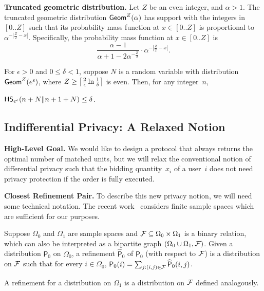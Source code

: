 


\noindent \textbf{Truncated geometric distribution.} Let $Z$ 
be an even integer,
and $\alpha > 1$. The truncated geometric distribution ${\sf Geom}^Z(\alpha)$ has support with the integers in $[0..Z]$ such that its probability mass function at $x \in [0..Z]$ is proportional to $\alpha^{-| \frac{Z}{2} - x |}$. Specifically, the probability mass function at $x \in [0..Z]$ is 
\[
\frac{\alpha - 1}{\alpha + 1 - 2 \alpha^{-\frac{Z}{2}}} \cdot \alpha^{-\left|\frac{Z}{2} - x \right|}.
\]

\begin{fact}
\label{fact:geom_dp}
For $\epsilon > 0$ and $0 \leq \delta < 1$, 
suppose $N$ is a random variable with distribution ${\sf Geom}^Z(e^\epsilon)$,
where $Z \geq \left \lceil \frac{2}{\epsilon} \ln \frac{1}{\delta} \right \rceil$ is even.
Then, for any integer~$n$,

${\sf HS}_{e^\epsilon}(n+N \| n+1 + N) \leq \delta$.
\end{fact}


\subsection{Indifferential Privacy: A Relaxed Notion}\label{sec:IDP}


\noindent \textbf{High-Level Goal.} We would like to design a protocol that always returns the optimal number of matched units, but we will relax the conventional notion of differential privacy such that the bidding quantity~$x_i$ of a user~$i$ does not need privacy protection if the order is fully executed.

\noindent \textbf{Closest Refinement Pair.} To describe this new privacy notion, we will need some technical notation. The recent work~\cite{DBLP:journals/corr/abs-2406-17964} considers finite sample spaces which are sufficient for our purposes.


\begin{definition}[Refinement]
Suppose $\Omega_0$ and $\Omega_1$ are sample spaces
and $\mathcal {F} \subseteq \Omega_0 \times \Omega_1$ is a binary relation,
which can also be interpreted as a bipartite graph $(\Omega_0 \cup \Omega_1, \mathcal {F})$.
Given a distribution $\mathsf{P}_0$ on $\Omega_0$,
a refinement $\widehat{\mathsf{P}}_0$ of $\mathsf{P}_0$ (with respect to $\mathcal {F}$)
is a distribution on $\mathcal {F}$ such that
for every $i \in \Omega_0$, $\mathsf{P}_0(i) = \sum_{j: (i,j) \in \mathcal {F}} \widehat{\mathsf{P}}_0(i,j)$.

A refinement for a distribution on $\Omega_1$ is a distribution on $\mathcal {F}$ defined analogously.
\end{definition}


